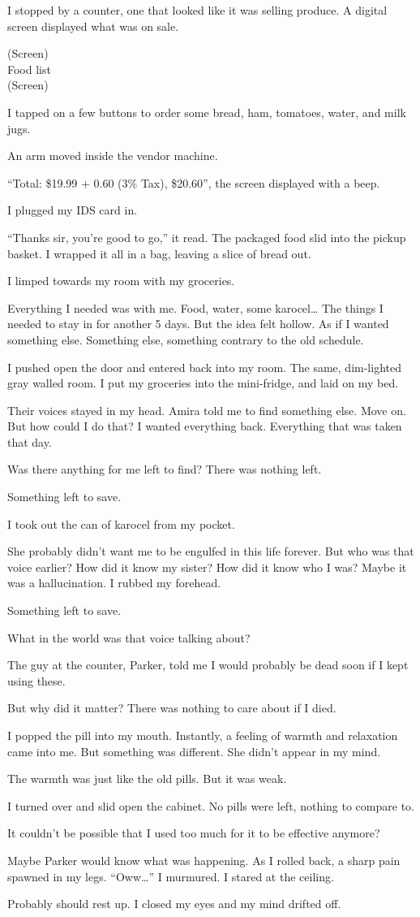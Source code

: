 I stopped by a counter, one that looked like it was selling produce. A digital screen displayed what was on sale.

(Screen) \\
Food list \\ 
(Screen)

I tapped on a few buttons to order some bread, ham, tomatoes, water, and milk jugs.

An arm moved inside the vendor machine.

“Total: \$19.99 + 0.60 (3\% Tax), \$20.60”, the screen displayed with a beep.

I plugged my IDS card in.

“Thanks sir, you’re good to go,” it read. The packaged food slid into the pickup basket. I wrapped it all in a bag, leaving a slice of bread out.

I limped towards my room with my groceries.

Everything I needed was with me. Food, water, some karocel… The things I needed to stay in for another 5 days.  But the idea felt hollow. As if I wanted something else. Something else, something contrary to the old schedule.

I pushed open the door and entered back into my room. The same, dim-lighted gray walled room. I put my groceries into the mini-fridge, and laid on my bed.

Their voices stayed in my head. Amira told me to find something else. Move on. But how could I do that? I wanted everything back. Everything that was taken that day.

Was there anything for me left to find? There was nothing left.

Something left to save.

I took out the can of karocel from my pocket.

She probably didn’t want me to be engulfed in this life forever. But who was that voice earlier? How did it know my sister? How did it know who I was? Maybe it was a hallucination. I rubbed my forehead. 

Something left to save. 

What in the world was that voice talking about?

The guy at the counter, Parker, told me I would probably be dead soon if I kept using these.

But why did it matter? There was nothing to care about if I died.

I popped the pill into my mouth. Instantly, a feeling of warmth and relaxation came into me. But something was different. She didn’t appear in my mind. 

The warmth was just like the old pills. But it was weak. 

I turned over and slid open the cabinet. No pills were left, nothing to compare to.

It couldn’t be possible that I used too much for it to be effective anymore?

Maybe Parker would know what was happening. As I rolled back, a sharp pain spawned in my legs. “Oww…” I murmured. I stared at the ceiling. 

Probably should rest up. I closed my eyes and my mind drifted off.

